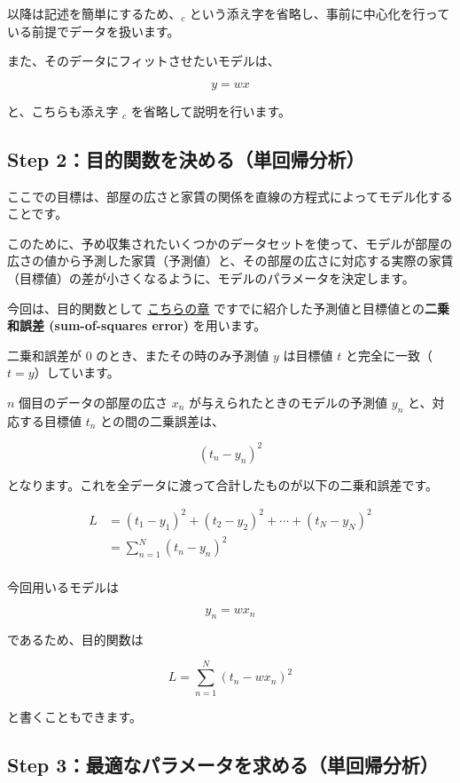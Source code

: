 以降は記述を簡単にするため、$_c$ という添え字を省略し、事前に中心化を行っている前提でデータを扱います。

また、そのデータにフィットさせたいモデルは、


\[
y = wx
\]


と、こちらも添え字 $_c$ を省略して説明を行います。


\subsection{Step 2：目的関数を決める（単回帰分析）}


ここでの目標は、部屋の広さと家賃の関係を直線の方程式によってモデル化することです。

このために、予め収集されたいくつかのデータセットを使って、モデルが部屋の広さの値から予測した家賃（予測値）と、その部屋の広さに対応する実際の家賃（目標値）の差が小さくなるように、モデルのパラメータを決定します。


今回は、目的関数として \href{https://tutorials.chainer.org/ja/03_Basic_Math_for_Machine_Learning.html#note2}{こちらの章} ですでに紹介した予測値と目標値との\textbf{二乗和誤差 (sum-of-squares error)} を用います。

二乗和誤差が $0$ のとき、またその時のみ予測値 $y$ は目標値 $t$ と完全に一致（$t = y$）しています。

$n$ 個目のデータの部屋の広さ $x_n$ が与えられたときのモデルの予測値 $y_n$ と、対応する目標値 $t_n$ との間の二乗誤差は、


\[
(t_{n} - y_{n})^{2}
\]


となります。これを全データに渡って合計したものが以下の二乗和誤差です。


\[
\begin{aligned}
L
&= (t_1 - y_1)^2
+ (t_2 - y_2)^2
+ \cdots
+ (t_N - y_N)^2 \\
&= \sum_{n=1}^N (t_n - y_n )^2 \\
\end{aligned}
\]


今回用いるモデルは


\[
y_{n} = wx_{n}
\]


であるため、目的関数は


\[
L = \sum_{n=1}^N (t_n - wx_n)^2
\]


と書くこともできます。


\subsection{Step 3：最適なパラメータを求める（単回帰分析）}


